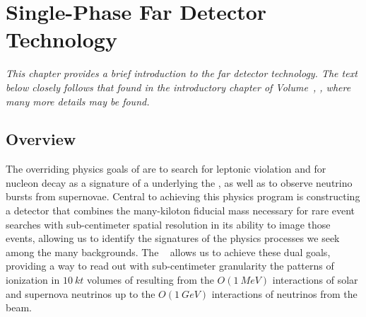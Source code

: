 \chapter{Single-Phase Far Detector Technology}
\label{ch:exec-sp}

\textit{This chapter provides a brief introduction to the  far detector technology.  The text below closely follows that found in the introductory chapter of Volume~\volnumbersp{}, \voltitlesp{}, where many more details may be found.}

\section{Overview}
\label{sec:exec-sp-over}

The overriding physics goals of  are to search for leptonic  violation and for nucleon decay as a signature of a  underlying the , as well as to observe neutrino bursts from supernovae. Central to achieving this physics program is constructing a detector that combines the many-kiloton fiducial mass necessary for rare event searches with sub-centimeter spatial resolution in its ability to image those events, allowing us to identify the signatures of the physics processes we seek among the many backgrounds. The  ~\cite{Rubbia:1977zz} allows us to achieve these dual goals, providing a way to read out with sub-centimeter granularity the patterns of ionization in $\SI{10}{kt}$ volumes of  resulting from the $O(\SI{1}{MeV})$ interactions of solar and supernova neutrinos up to the $O(\SI{1}{GeV})$ interactions of neutrinos from the  beam.

